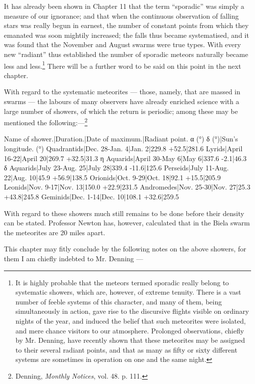 \documentclass[a4paper, 12pt, oneside, polutonikogreek, english]{article}
\begin{document}
It has already been shown in Chapter 11 that the term ``sporadic'' was simply a measure of our ignorance; and that when the continuous observation of falling stars was really begun in earnest, the number of constant points from which they emanated was soon mightily increased; the falls thus became systematised, and it was found that the November and August swarms were true types. With every new ``radiant'' thus established the number of sporadic meteors naturally became less and less.\footnote{It is highly probable that the meteors termed sporadic really belong to systematic showers, which are, however, of extreme tenuity. There is a vast number of feeble systems of this character, and many of them, being simultaneously in action, gave rise to the discursive flights visible on ordinary nights of the year, and induced the belief that such meteorites were isolated, and mere chance visitors to our atmosphere. Prolonged observations, chiefly by Mr. Denning, have recently shown that these meteorites may be assigned to their several radiant points, and that as many as fifty or sixty different systems are sometimes in operation on one and the same night.} There will be a further word to be said on this point in the next chapter.

With regard to the systematic meteorites --- those, namely, that are massed in swarms --- the labours of many observers have already enriched science with a large number of showers, of which the return is periodic; among these may be mentioned the following:---\footnote{Denning, \emph{Monthly Notices}, vol. 48. p. 111.}

Name of shower.|Duration.|Date of maximum.|Radiant point. α (°) δ (°)|Sun's longitude. (°) 
Quadrantids|Dec. 28-Jan. 4|Jan. 2|229.8 +52.5|281.6 
Lyrids|April 16-22|April 20|269.7 +32.5|31.3 
η Aquarids|April 30-May 6|May 6|337.6 -2.1|46.3 
δ Aquarids|July 23-Aug. 25|July 28|339.4 -11.6|125.6 
Perseids|July 11-Aug. 22|Aug. 10|45.9 +56.9|138.5 
Orionids|Oct. 9-29|Oct. 18|92.1 +15.5|205.9 
Leonids|Nov. 9-17|Nov. 13|150.0 +22.9|231.5 
Andromedes|Nov. 25-30|Nov. 27|25.3 +43.8|245.8 
Geminids|Dec. 1-14|Dec. 10|108.1 +32.6|259.5

With regard to these showers much still remains to be done before their density can be stated. Professor Newton has, however, calculated that in the Biela swarm the meteorites are 20 miles apart.

This chapter may fitly conclude by the following notes on the above showers, for them I am chiefly indebted to Mr. Denning ---
\end{document}
